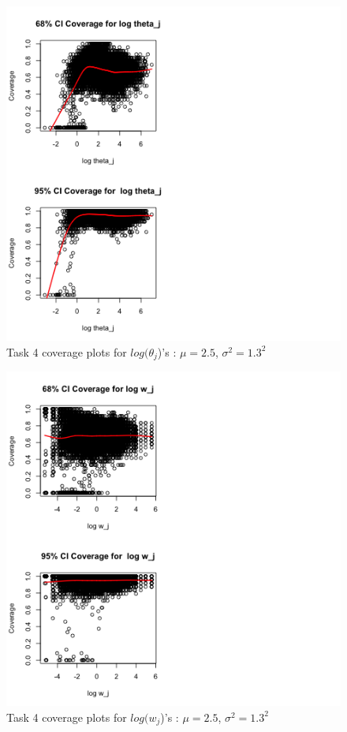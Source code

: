 \documentclass[paper=a4, fontsize=11pt]{scrartcl}
\begin{document}
\begin{figure}[h!]
  \caption{Task 4 coverage plots for $log(\theta_{j}$)'s : $\mu = 2.5$, $\sigma^2 = 1.3^2$}
  \centering
	\includegraphics[scale=1, trim = 0 0 200 0]{keskici_wxiao_ps2_task4_plot3.png}
\end{figure}

\begin{figure}[h!]
  \caption{Task 4 coverage plots for $log(w_{j}$)'s : $\mu = 2.5$, $\sigma^2 = 1.3^2$}
  \centering
	\includegraphics[scale=1, trim = 0 0 200 0]{keskici_wxiao_ps2_task4_plot4.png}
\end{figure}
\end{document}
